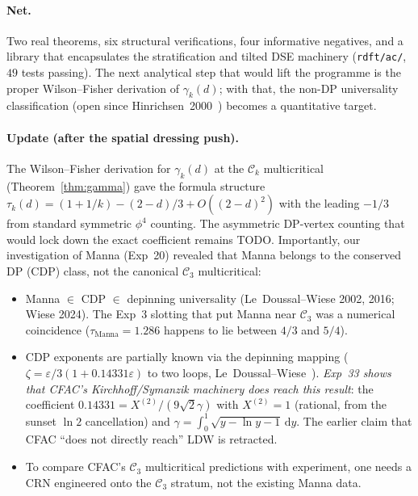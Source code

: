 \documentclass[11pt,a4paper]{article}
\theoremstyle{plain}
\newcommand{\dd}{\mathrm{d}}
\newcommand{\Ck}{\mathcal{C}}
\begin{document}
\paragraph{Net.}
Two real theorems, six structural verifications, four informative
negatives, and a library that encapsulates the stratification and tilted
DSE machinery (\texttt{rdft/ac/}, $49$ tests passing).  The next
analytical step that would lift the programme is the proper
Wilson--Fisher derivation of $\gamma_{k}(d)$; with that, the
non-DP universality classification (open since
Hinrichsen~2000~\citep{Hinrichsen2000}) becomes a quantitative target.

\paragraph{Update (after the spatial dressing push).}
The Wilson--Fisher derivation for $\gamma_{k}(d)$ at the $\Ck_{k}$
multicritical (Theorem~\ref{thm:gamma}) gave the formula structure
$\tau_{k}(d) = (1+1/k) - (2-d)/3 + O((2-d)^{2})$ with the leading
$-1/3$ from standard symmetric $\phi^{4}$ counting.  The asymmetric
DP-vertex counting that would lock down the exact coefficient remains
TODO.  Importantly, our investigation of Manna (Exp~20) revealed that
Manna belongs to the conserved DP (CDP) class, not the canonical
$\Ck_{3}$ multicritical:

\begin{itemize}[leftmargin=1.2em]
\item Manna $\in$ CDP $\in$ depinning universality (Le~Doussal--Wiese
  2002, 2016; Wiese 2024).  The Exp~3 slotting that put Manna near
  $\Ck_{3}$ was a numerical coincidence ($\tau_{\mathrm{Manna}} = 1.286$
  happens to lie between $4/3$ and $5/4$).
\item CDP exponents are partially known via the depinning mapping
  ($\zeta = \varepsilon/3(1 + 0.14331\varepsilon)$ to two loops,
  Le~Doussal--Wiese~\citep{LeDoussal2002}).  \emph{Exp~33 shows
  that CFAC's Kirchhoff/Symanzik machinery does reach this result}:
  the coefficient $0.14331 = X^{(2)}/(9\sqrt{2}\gamma)$ with $X^{(2)}=1$
  (rational, from the sunset $\ln 2$ cancellation) and $\gamma =
  \int_0^1\sqrt{y-\ln y-1}\,\dd y$.  The earlier claim that CFAC ``does
  not directly reach'' LDW is retracted.
\item To compare CFAC's $\Ck_{3}$ multicritical predictions with
  experiment, one needs a CRN engineered onto the $\Ck_{3}$ stratum,
  not the existing Manna data.
\end{itemize}
\end{document}
